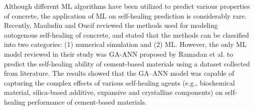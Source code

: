 \documentclass[11pt]{article}
\begin{document}

    Although different ML algorithms have been utilized to predict various properties of concrete, the application of ML on self-healing prediction is considerably rare. Recently, Mauludin and Oucif \cite{mauludin2019modeling} reviewed the methods used for modeling autogenous self-healing of concrete, and stated that the methods can be classified into two categories: (1) numerical simulation and (2) ML. However, the only ML model reviewed in their study was GA-ANN proposed by Ramadan et al. \cite{ramadan2017modeling} to predict the self-healing ability of cement-based materials using a dataset collected from literature. The results showed that the  GA–ANN model was capable of capturing the complex effects of various self-healing agents (e.g., biochemical material, silica-based additive, expansive and crystalline components) on self-healing performance of cement-based materials. 
	
	
		
		
	
\end{document}
